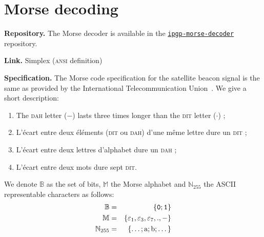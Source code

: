 \documentclass[a4paper]{report}
\newenvironment{definition}[1][Definition.]{\begin{trivlist}
\item[\hskip \labelsep {\bfseries #1}]}{\end{trivlist}}
\begin{document}
\section{Morse decoding}

\textbf{Repository.} The Morse decoder is available in the \href{https://github.com/EmptyStackExn/ipgp-morse-decoder}{\texttt{ipgp-morse-decoder}} repository.

\textbf{Link.} Simplex (\textsc{ansi} definition)

\vspace{0.3cm}

\textbf{Specification.}
The Morse code specification for the satellite beacon signal is the same as provided by the International Telecommunication Union~\cite{ITU_morse}. We give a short description:

\begin{enumerate}
  \item{The \textsc{dah} letter ($-$) lasts three times longer than the \textsc{dit} letter ($\cdot$) ;}
  \item{L'\'ecart entre deux \'el\'ements (\textsc{dit} ou \textsc{dah}) d'une m\^eme lettre dure un \textsc{dit} ;}
  \item{L'\'ecart entre deux lettres d'alphabet dure un \textsc{dah} ;}
  \item{L'\'ecart entre deux mots dure sept \textsc{dit}.}
\end{enumerate}

\begin{definition}
  We denote $\mathbb{B}$ as the set of bits, $\mathbb{M}$ the Morse alphabet and $\mathbb{N}_{255}$ the ASCII representable characters as follows:
  \begin{eqnarray*}
    \mathbb{B}      &=& \left \{ \texttt{0} ; \texttt{1} \right \}\\
    \mathbb{M}      &=& \left \{ \varepsilon_1, \varepsilon_3, \varepsilon_7, ., - \right \}\\
    \mathbb{N}_{255} &=& \left \{ \dots ; \textup{a} ; \textup{b} ; \dots \right \}
  \end{eqnarray*}
\end{definition}
\end{document}
